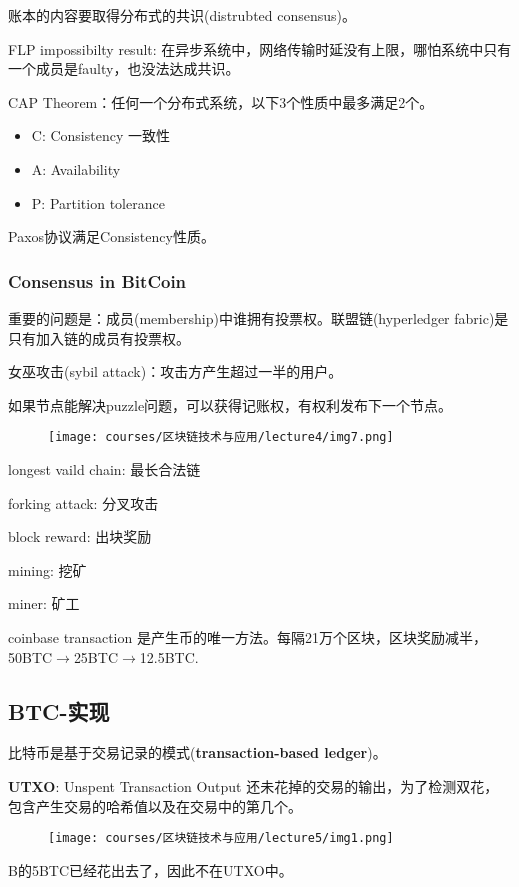 \documentclass[10pt]{ctexart}
\begin{document}
账本的内容要取得分布式的共识(distrubted consensus)。

FLP impossibilty result: 在异步系统中，网络传输时延没有上限，哪怕系统中只有一个成员是faulty，也没法达成共识。

CAP Theorem：任何一个分布式系统，以下3个性质中最多满足2个。
\begin{itemize}
    \item C: Consistency 一致性
    \item A: Availability
    \item P: Partition tolerance
\end{itemize}
Paxos协议满足Consistency性质。
\subsubsection{Consensus in BitCoin}
重要的问题是：成员(membership)中谁拥有投票权。联盟链(hyperledger fabric)是只有加入链的成员有投票权。

女巫攻击(sybil attack)：攻击方产生超过一半的用户。

如果节点能解决puzzle问题，可以获得记账权，有权利发布下一个节点。
\begin{figure}[H]
    \centering
    \texttt{[image: courses/区块链技术与应用/lecture4/img7.png]} 
\end{figure}
longest vaild chain: 最长合法链

forking attack: 分叉攻击

block reward: 出块奖励

mining: 挖矿

miner: 矿工

coinbase transaction 是产生币的唯一方法。每隔21万个区块，区块奖励减半，50BTC$\rightarrow$25BTC$\rightarrow$12.5BTC.
\subsection{BTC-实现}
比特币是基于交易记录的模式(\textbf{transaction-based ledger})。

\textbf{UTXO}: Unspent Transaction Output 还未花掉的交易的输出，为了检测双花，包含产生交易的哈希值以及在交易中的第几个。
\begin{figure}[H]
    \centering
    \texttt{[image: courses/区块链技术与应用/lecture5/img1.png]} 
\end{figure}
B的5BTC已经花出去了，因此不在UTXO中。
\end{document}
